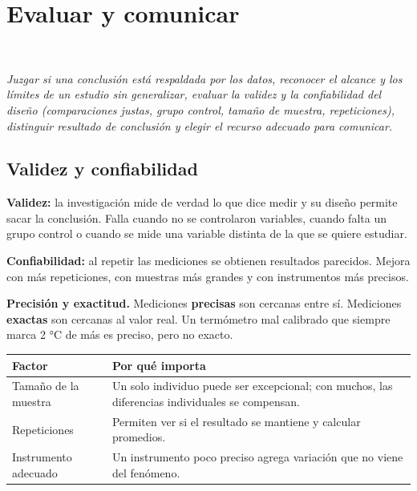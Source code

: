 \section[Evaluar y comunicar]{Evaluar y comunicar}
\modcomun\ \ {\color{gris}\itshape Juzgar si una conclusión está respaldada por los datos, reconocer el alcance y los límites de un estudio sin generalizar, evaluar la validez y la confiabilidad del diseño (comparaciones justas, grupo control, tamaño de muestra, repeticiones), distinguir resultado de conclusión y elegir el recurso adecuado para comunicar.\par}
\subsection{Validez y confiabilidad}
\textbf{Validez:} la investigación mide de verdad lo que dice medir y su diseño permite sacar la conclusión. Falla cuando no se controlaron variables, cuando falta un grupo control o cuando se mide una variable distinta de la que se quiere estudiar.

 

\textbf{Confiabilidad:} al repetir las mediciones se obtienen resultados parecidos. Mejora con más repeticiones, con muestras más grandes y con instrumentos más precisos.

 

\textbf{Precisión y exactitud.} Mediciones \textbf{precisas} son cercanas entre sí. Mediciones \textbf{exactas} son cercanas al valor real. Un termómetro mal calibrado que siempre marca 2 °C de más es preciso, pero no exacto.

 
\begin{center}\small
\begin{tabularx}{\linewidth}{@{}>{\raggedright\arraybackslash\hsize=0.67\hsize}X>{\raggedright\arraybackslash\hsize=1.33\hsize}X@{}}
\toprule
\textbf{Factor} & \textbf{Por qué importa} \\
\midrule
Tamaño de la muestra & Un solo individuo puede ser excepcional; con muchos, las diferencias individuales se compensan. \\
Repeticiones & Permiten ver si el resultado se mantiene y calcular promedios. \\
Instrumento adecuado & Un instrumento poco preciso agrega variación que no viene del fenómeno. \\
\bottomrule
\end{tabularx}
\end{center}
  
